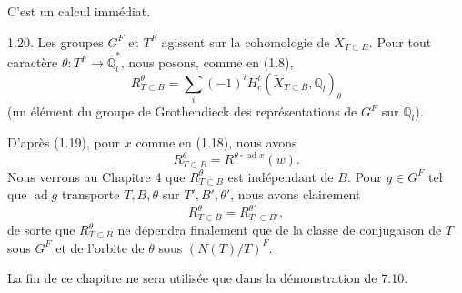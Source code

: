 \documentclass[9pt,twoside]{extarticle}
\begin{document}
{C'est un calcul immédiat.\par

1.20. Les groupes \(G^F\) et \(T^F\) agissent sur la cohomologie de \(\widetilde X_{T\subset B}\). Pour tout caractère \(\theta:T^F\to\overline{\mathbb Q}_l^*\), nous posons, comme en (1.8), \[
R_{T\subset B}^{\theta}=\sum_i(-1)^iH_c^i(\widetilde X_{T\subset B},\overline{\mathbb Q}_l)_\theta
\] (un élément du groupe de Grothendieck des représentations de \(G^F\) sur \(\overline{\mathbb Q}_l\)).\par

D'après (1.19), pour \(x\) comme en (1.18), nous avons \[
R_{T\subset B}^{\theta}=R^{\theta\circ\operatorname{ad}x}(w).
\] Nous verrons au Chapitre 4 que \(R_{T\subset B}^{\theta}\) est indépendant de \(B\). Pour \(g\in G^F\) tel que \(\operatorname{ad}g\) transporte \(T,B,\theta\) sur \(T',B',\theta'\), nous avons clairement \[
R_{T\subset B}^{\theta}=R_{T'\subset B'}^{\theta'},
\] de sorte que \(R_{T\subset B}^{\theta}\) ne dépendra finalement que de la classe de conjugaison de \(T\) sous \(G^F\) et de l'orbite de \(\theta\) sous \((N(T)/T)^F\).\par

La fin de ce chapitre ne sera utilisée que dans la démonstration de 7.10.\par
}
\end{document}
